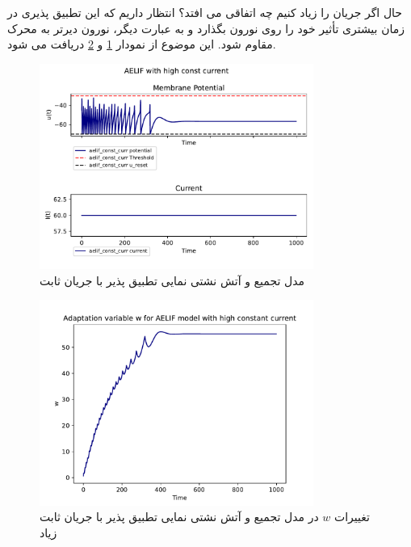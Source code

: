 \documentclass{article}
\begin{document}
                حال اگر جریان را زیاد کنیم چه اتفاقی می افتد؟ انتظار داریم که این تطبیق پذیری در زمان بیشتری تأثیر خود را روی نورون بگذارد و به عبارت دیگر، نورون دیرتر به محرک مقاوم شود. این موضوع از نمودار
                \ref{fig:aelif-high-const-curr} و
                \ref{fig:aelif-w-high-const-curr}
                دریافت می شود.
                \begin{figure}[H]
                    \centering
                    \includegraphics[width=0.8\textwidth]{plots/AELIF with high const current.pdf} 
                    \caption{مدل تجمیع و آتش نشتی نمایی تطبیق پذیر با جریان ثابت}
                    \label{fig:aelif-high-const-curr}
                \end{figure}
                \begin{figure}[H]
                    \centering
                    \includegraphics[width=0.8\textwidth]{plots/Adaptation variable w for AELIF model with high constant current.pdf} 
                    \caption{تغییرات $w$ در مدل تجمیع و آتش نشتی نمایی تطبیق پذیر با جریان ثابت زیاد}
                    \label{fig:aelif-w-high-const-curr}
                \end{figure}
\end{document}
